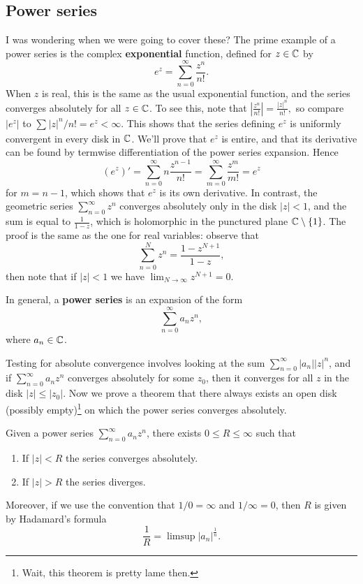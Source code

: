\subsection{Power series }
I was wondering when we were going to cover these? The prime example of a power series is the complex \textbf{exponential} function, defined for $z\in \mathbb{C}$ by \[
e^z = \sum_{n=0}^{\infty} \frac{z^n }{n!}.
\] When $z$ is real, this is the same as the usual exponential function, and the series converges absolutely for all $z\in \mathbb{C}$. To see this, note that $ 
\left| \frac{z^n }{n!} \right| = \frac{|z|^n }{n!},
$ so compare $|e^z|$ to $\sum_{}^{} |z|^n  / n!=e^{{z}}<\infty.$ This shows that the series defining $e^z$ is uniformly convergent in every disk in $\mathbb{C}$. We'll prove that $e^z$ is entire, and that its derivative can be found by termwise differentiation of the power series expansion. Hence \[
(e^z)'=\sum_{n=0}^{\infty} n \frac{z^{n-1}}{n!}=\sum_{m=0}^{\infty} \frac{z^m}{m!}=e^z
\] for $m=n-1$, which shows that $e^z$ is its own derivative. In contrast, the geometric series $\sum_{n=0}^{\infty} z^n$ converges absolutely only in the disk $|z|<1$, and the sum is equal to $\frac{1}{1-z}$, which is holomorphic in the punctured plane $\mathbb{C}\setminus \{1\} $. The proof is the same as the one for real variables: observe that \[
\sum_{n=0}^{N} z^n = \frac{1-z^{N+1}}{1-z},
\] then note that if $|z|<1$ we have $\lim_{N\to \infty}z^{N+1}=0$.
\begin{definition}
    In general, a \textbf{power series} is an expansion of the form \[
    \sum_{n=0}^{\infty} a_n z^n , 
    \] where $a_n \in \mathbb{C}$.
\end{definition}
Testing for absolute convergence involves looking at the sum $\sum_{n=0}^{\infty} |a_n | |z|^n $, and if $\sum_{n=0}^{\infty} a_n z^n $ converges absolutely for some $z_0$, then it converges for all $z$ in the disk $|z|\leq|z_0|$. Now we prove a theorem that there always exists an open disk (possibly empty)\footnote{Wait, this theorem is pretty lame then.} on which the power series converges absolutely.
\begin{theorem}
    Given a power series $\sum_{n=0}^{\infty} a_n z^n $, there exists $0\leq R\leq \infty$ such that 
    \begin{enumerate}[label=(\roman*)]
        \item If $|z|<R$ the series converges absolutely.
        \item If $|z|>R$ the series diverges.
    \end{enumerate}
    Moreover, if we use the convention that $1 /0=\infty$ and $1 /\infty=0$, then $R$ is given by Hadamard's formula \[
    \frac{1}{R}=\limsup |a_n |^{\frac{1}{n}}.
    \] 
\end{theorem}

